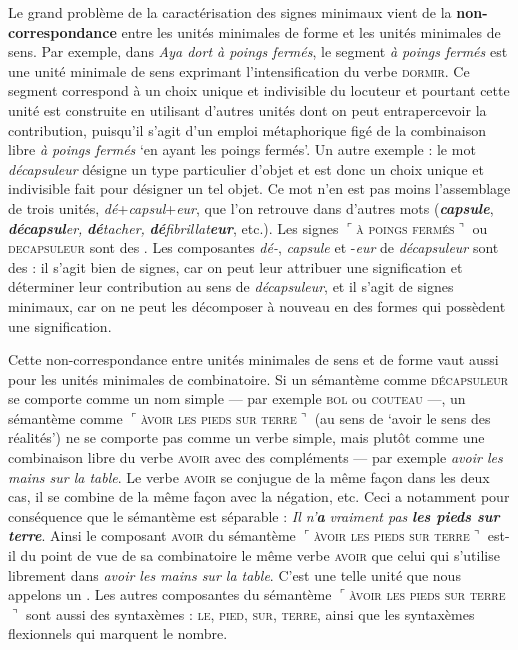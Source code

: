 Le grand problème de la caractérisation des signes minimaux vient de la \textbf{non-correspondance} entre les unités minimales de forme et les unités minimales de sens. Par exemple, dans \textit{Aya dort à poings fermés}, le segment \textit{à poings fermés} est une unité minimale de sens exprimant l’intensification du verbe \textsc{dormir}. Ce segment correspond à un choix unique et indivisible du locuteur et pourtant cette unité est construite en utilisant d’autres unités dont on peut entrapercevoir la contribution, puisqu’il s’agit d’un emploi métaphorique figé de la combinaison libre \textit{à poings fermés} ‘en ayant les poings fermés’. Un autre exemple : le mot \textit{décapsuleur} désigne un type particulier d’objet et est donc un choix unique et indivisible fait pour désigner un tel objet. Ce mot n’en est pas moins l’assemblage de trois unités, \textit{dé}+\textit{capsul}+\textit{eur}, que l’on retrouve dans d’autres mots (\textbf{\textit{capsule}}, \textbf{\textit{décapsul}}\textit{er,} \textbf{\textit{dé}}\textit{tacher,} \textbf{\textit{dé}}\textit{fibrillat}\textbf{\textit{eur}}, etc.). Les signes $⌜$\textsc{à} \textsc{poings} \textsc{fermés}$⌝$ ou \textsc{decapsuleur} sont des . Les composantes \textit{dé-}, \textit{capsule} et -\textit{eur} de \textit{décapsuleur} sont des : il s’agit bien de signes, car on peut leur attribuer une signification et déterminer leur contribution au sens de \textit{décapsuleur}, et il s’agit de signes minimaux, car on ne peut les décomposer à nouveau en des formes qui possèdent une signification.

Cette non-correspondance entre unités minimales de sens et de forme vaut aussi pour les unités minimales de combinatoire. Si un sémantème comme \textsc{décapsuleur} se comporte comme un nom simple — par exemple \textsc{bol} ou \textsc{couteau} —, un sémantème comme $⌜$\textsc{àvoir} \textsc{les} \textsc{pieds} \textsc{sur} \textsc{terre}$⌝$ (au sens de ‘avoir le sens des réalités’) ne se comporte pas comme un verbe simple, mais plutôt comme une combinaison libre du verbe \textsc{avoir} avec des compléments — par exemple \textit{avoir les mains sur la table}. Le verbe \textsc{avoir} se conjugue de la même façon dans les deux cas, il se combine de la même façon avec la négation, etc. Ceci a notamment pour conséquence que le sémantème est séparable : \textit{Il n’}\textbf{\textit{a}} \textit{vraiment pas} \textbf{\textit{les pieds sur terre}}. Ainsi le composant \textsc{avoir} du sémantème $⌜$\textsc{àvoir} \textsc{les} \textsc{pieds} \textsc{sur} \textsc{terre}$⌝$ est-il du point de vue de sa combinatoire le même verbe \textsc{avoir} que celui qui s’utilise librement dans \textit{avoir les mains sur la table}. C’est une telle unité que nous appelons un . Les autres composantes du sémantème $⌜$\textsc{àvoir} \textsc{les} \textsc{pieds} \textsc{sur} \textsc{terre}$⌝$ sont aussi des syntaxèmes : \textsc{le,} \textsc{pied,} \textsc{sur,} \textsc{terre}, ainsi que les syntaxèmes flexionnels qui marquent le nombre.

